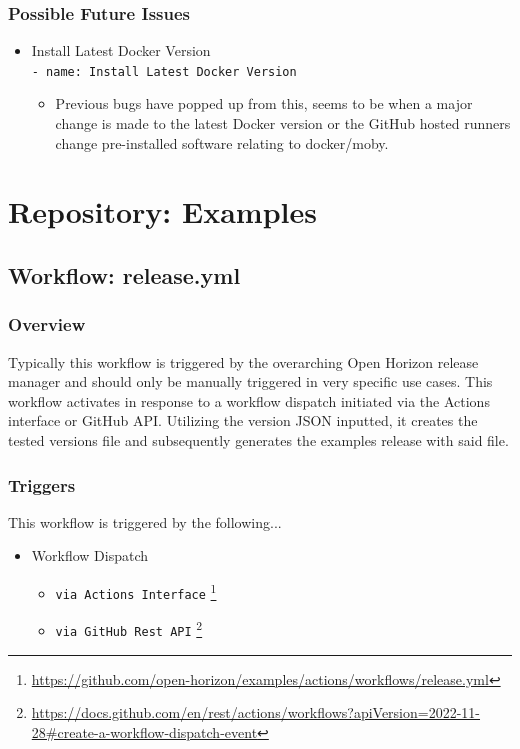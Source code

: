 \documentclass[a4paper,11pt]{article}
\begin{document}
\subsubsection{Possible Future Issues}
\begin{itemize}
    \item Install Latest Docker Version\\\verb|- name: Install Latest Docker Version|
    \begin{itemize}
        \item Previous bugs have popped up from this, seems to be when a major change is made to the latest Docker version or the GitHub hosted runners change pre-installed software relating to docker/moby.
    \end{itemize}
\end{itemize}


\newpage
\section{Repository: Examples}

\subsection{Workflow: release.yml}

\subsubsection{Overview}
Typically this workflow is triggered by the overarching Open Horizon release manager and should only be manually triggered in very specific use cases. This workflow activates in response to a workflow dispatch initiated via the Actions interface or GitHub API. Utilizing the version JSON inputted, it creates the tested versions file and subsequently generates the examples release with said file.

\subsubsection{Triggers}
This workflow is triggered by the following...
\begin{itemize}
    \item Workflow Dispatch
    \begin{itemize}
        \item\verb|via Actions Interface| \footnote{\href{https://github.com/open-horizon/examples/actions/workflows/release.yml}{https://github.com/open-horizon/examples/actions/workflows/release.yml}}
        \item\verb|via GitHub Rest API| \footnote{\href{https://docs.github.com/en/rest/actions/workflows?apiVersion=2022-11-28\#create-a-workflow-dispatch-event}{https://docs.github.com/en/rest/actions/workflows?apiVersion=2022-11-28\#create-a-workflow-dispatch-event}}
    \end{itemize}
\end{itemize}
\end{document}
